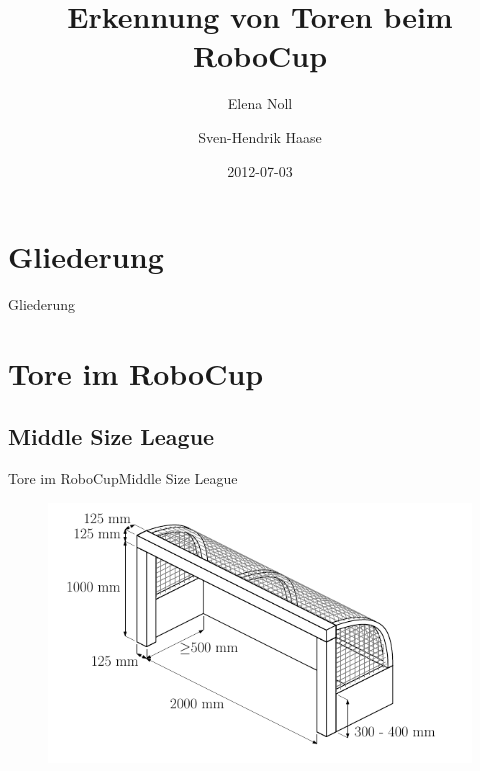 \documentclass{beamer}
\begin{document}
\title{Erkennung von Toren beim RoboCup}
\date{2012-07-03}
\author{Elena Noll \and Sven-Hendrik Haase}

\begin{frame}
    \titlepage
\end{frame}

\section*{Gliederung}
\begin{frame}{Gliederung}
    \tableofcontents
\end{frame}

\section{Tore im RoboCup}

\subsection{Middle Size League}
\begin{frame}{Tore im RoboCup}{Middle Size League}
\begin{figure}[htp]
\centering
\includegraphics[scale=0.65]{middlesize-goal.png}
\end{figure}
\end{frame}
\end{document}
